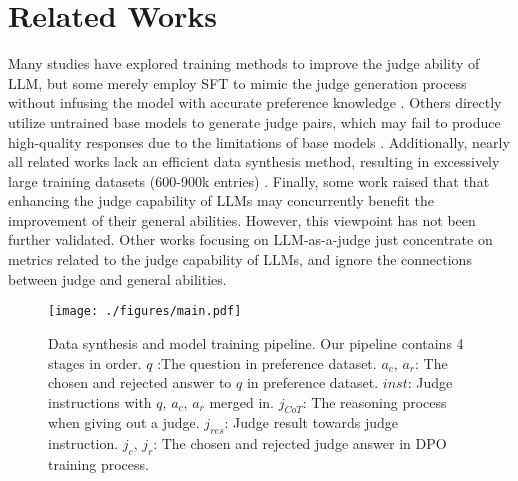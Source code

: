 \section{Related Works}
Many studies have explored training methods to improve the judge ability of LLM, but some merely employ SFT to mimic the judge generation process without infusing the model with accurate preference knowledge \citep{kim2024prometheus,zhang2024generative} . Others directly utilize untrained base models to generate judge pairs, which may fail to produce high-quality responses due to the limitations of base models \citep{ye2024beyond,wang2024direct}. Additionally, nearly all related works lack an efficient data synthesis method, resulting in excessively large training datasets (600-900k entries) \citep{wang2024direct,cao2024compassjudger}. Finally, some work \cite{cao2024compassjudger} raised that that enhancing the judge capability of LLMs may concurrently benefit the improvement of their general abilities. However, this viewpoint has not been further validated. Other works \cite{ye2024beyond,liu2024skywork} focusing on LLM-as-a-judge just concentrate on metrics related to the judge capability of LLMs, and ignore the connections between judge and general abilities.

\begin{figure*}[t]
  \texttt{[image: ./figures/main.pdf]}
  \caption {Data synthesis and model training pipeline. Our pipeline contains 4 stages in order. $q$ :The question in preference dataset. $a_c$, $a_r$: The chosen and rejected answer to $q$ in preference dataset. $inst$: Judge instructions with $q$, $a_c$, $a_r$ merged in. $j_{CoT}$: The reasoning process when giving out a judge. $j_{res}$: Judge result towards judge instruction. $j_c$, $j_r$: The chosen and rejected judge answer in DPO training process.}
    \label{fig:main}
\end{figure*}